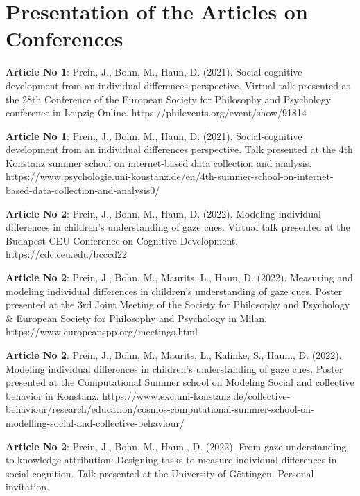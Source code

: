 \documentclass[
]{scrbook}
\begin{document}
\section*{Presentation of the Articles on Conferences}\label{presentation-of-the-articles-on-conferences}

\begin{hangparas}{5mm}{1}
\textbf{Article No 1}: Prein, J., Bohn, M., Haun, D. (2021). Social-cognitive development from an individual differences perspective. Virtual talk presented at the 28th Conference of the European Society for Philosophy and Psychology conference in Leipzig-Online. https://philevents.org/event/show/91814

\textbf{Article No 1}: Prein, J., Bohn, M., Haun, D. (2021). Social-cognitive development from an individual differences perspective. Talk presented at the 4th Konstanz summer school on internet-based data collection and analysis. https://www.psychologie.uni-konstanz.de/en/4th-summer-school-on-internet-based-data-collection-and-analysis0/

\textbf{Article No 2}: Prein, J., Bohn, M., Haun, D. (2022). Modeling individual differences in children’s understanding of gaze cues. Virtual talk presented at the Budapest CEU Conference on Cognitive Development. https://cdc.ceu.edu/bcccd22

\textbf{Article No 2}: Prein, J., Bohn, M., Maurits, L., Haun, D. (2022). Measuring and modeling individual differences in children’s understanding of gaze cues. Poster presented at the 3rd Joint Meeting of the Society for Philosophy and Psychology \& European Society for Philosophy and Psychology in Milan. https://www.europeanspp.org/meetings.html

\textbf{Article No 2}: Prein, J., Bohn, M., Maurits, L., Kalinke, S., Haun., D. (2022). Modeling individual differences in children’s understanding of gaze cues. Poster presented at the Computational Summer school on Modeling Social and collective behavior in Konstanz. https://www.exc.uni-konstanz.de/collective-behaviour/research/education/cosmos-computational-summer-school-on-modelling-social-and-collective-behaviour/

\textbf{Article No 2}: Prein, J., Bohn, M., Haun., D. (2022). From gaze understanding to knowledge attribution: Designing tasks to measure individual differences in social cognition. Talk presented at the University of Göttingen. Personal invitation.


\end{hangparas}
\end{document}
